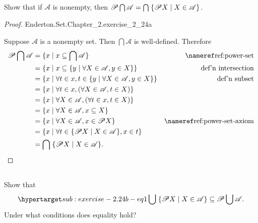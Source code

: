 \documentclass{report}
\begin{document}
\subsection{}%

Show that if $\mathscr{A}$ is nonempty, then
  $\mathscr{P}\bigcap\mathscr{A} =
    \bigcap\; \{\mathscr{P}X \mid X \in \mathscr{A} \}$.

\begin{proof}

    {Enderton.Set.Chapter\_2.exercise\_2\_24a}

  Suppose $\mathscr{A}$ is a nonempty set.
  Then $\bigcap \mathscr{A}$ is well-defined.
  Therefore
    \begin{align*}
      \powerset{\bigcap\mathscr{A}}
        & = \{ x \mid x \subseteq \bigcap \mathscr{A} \}
          & \textref{ref:power-set} \\
        & = \{ x \mid x \subseteq
          \{ y \mid \forall X \in \mathscr{A}, y \in X \} \}
          & \text{def'n intersection} \\
        & = \{ x \mid \forall t \in x,
          t \in \{ y \mid \forall X \in \mathscr{A}, y \in X \} \}
          & \text{def'n subset} \\
        & = \{ x \mid \forall t \in x,
          (\forall X \in \mathscr{A}, t \in X) \} \\
        & = \{ x \mid \forall X \in \mathscr{A},
          (\forall t \in x, t \in X) \} \\
        & = \{ x \mid \forall X \in \mathscr{A}, x \subseteq X \} \\
        & = \{ x \mid \forall X \in \mathscr{A}, x \in \powerset{X} \}
          & \textref{ref:power-set-axiom} \\
        & = \{ x \mid
          \forall t \in \{ \powerset{X} \mid X \in \mathscr{A} \}, x \in t \} \\
        & = \bigcap\; \{\powerset{X} \mid X \in \mathscr{A}\}.
    \end{align*}

\end{proof}

\subsection{}%

Show that
  \begin{equation}
    \hyperlabel{sub:exercise-2.24b-eq1}
    \bigcup\; \{ \powerset{X} \mid X \in \mathscr{A} \} \subseteq
      \powerset{\bigcup\mathscr{A}}.
  \end{equation}
Under what conditions does equality hold?
\end{document}

